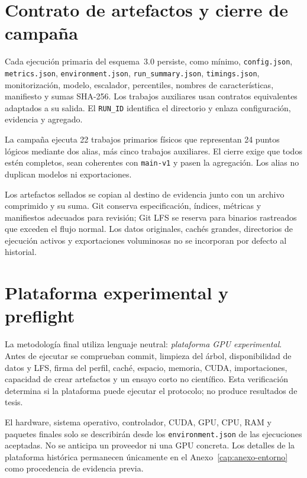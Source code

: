 \section{Contrato de artefactos y cierre de campaña}

Cada ejecución primaria del esquema~3.0 persiste, como mínimo, \texttt{config.json}, \texttt{metrics.json}, \texttt{environment.json}, \texttt{run\_summary.json}, \texttt{timings.json}, monitorización, modelo, escalador, percentiles, nombres de características, manifiesto y sumas SHA-256. Los trabajos auxiliares usan contratos equivalentes adaptados a su salida. El \texttt{RUN\_ID} identifica el directorio y enlaza configuración, evidencia y agregado.

La campaña ejecuta 22 trabajos primarios físicos que representan 24 puntos lógicos mediante dos alias, más cinco trabajos auxiliares. El cierre exige que todos estén completos, sean coherentes con \texttt{main-v1} y pasen la agregación. Los alias no duplican modelos ni exportaciones.

Los artefactos sellados se copian al destino de evidencia junto con un archivo comprimido y su suma. Git conserva especificación, índices, métricas y manifiestos adecuados para revisión; Git LFS se reserva para binarios rastreados que exceden el flujo normal. Los datos originales, cachés grandes, directorios de ejecución activos y exportaciones voluminosas no se incorporan por defecto al historial.

\section{Plataforma experimental y preflight}

La metodología final utiliza lenguaje neutral: \emph{plataforma GPU experimental}. Antes de ejecutar se comprueban commit, limpieza del árbol, disponibilidad de datos y LFS, firma del perfil, caché, espacio, memoria, CUDA, importaciones, capacidad de crear artefactos y un ensayo corto no científico. Esta verificación determina si la plataforma puede ejecutar el protocolo; no produce resultados de tesis.

El hardware, sistema operativo, controlador, CUDA, GPU, CPU, RAM y paquetes finales solo se describirán desde los \texttt{environment.json} de las ejecuciones aceptadas. No se anticipa un proveedor ni una GPU concreta. Los detalles de la plataforma histórica permanecen únicamente en el Anexo~\ref{cap:anexo-entorno} como procedencia de evidencia previa.

